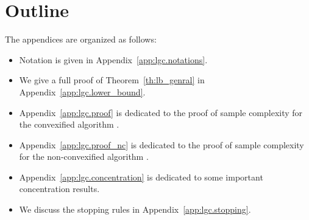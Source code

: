 \section{Outline}\label{app:lgc.outline}

The appendices are organized as follows:
\begin{itemize}[label=$\square$]
    \item Notation is given in Appendix~\ref{app:lgc.notations}. 
    \item We give a full proof of Theorem~\ref{th:lb_genral} in Appendix~\ref{app:lgc.lower_bound}.
    \item Appendix~\ref{app:lgc.proof} is dedicated to the proof of sample complexity for the convexified algorithm \LGC.
    \item Appendix~\ref{app:lgc.proof_nc} is dedicated to the proof of sample complexity for the non-convexified algorithm \LG.
    \item Appendix~\ref{app:lgc.concentration} is dedicated to some important concentration results.
    \item We discuss the stopping rules in Appendix~\ref{app:lgc.stopping}.
\end{itemize}
